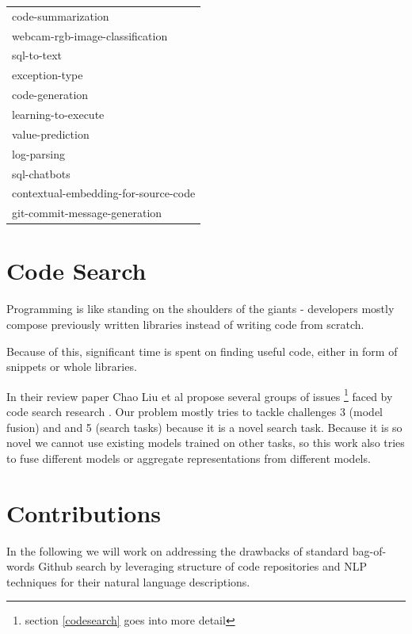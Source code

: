 \documentclass[11pt]{report}
\begin{document}
\begin{table}[htbp]
\begin{tabular}{|l|}
                            code-summarization \\
               {\color{red} webcam-rgb-image-classification}\\
                                   sql-to-text \\
                                exception-type \\
                               code-generation \\
                           learning-to-execute \\
                              value-prediction \\
                                   log-parsing \\
                                  sql-chatbots \\
          contextual-embedding-for-source-code \\
                 git-commit-message-generation \\
\bottomrule
\hline
\end{tabular}
\end{table}


\section{Code Search}


Programming is like standing on the shoulders of the giants - developers mostly compose previously written libraries instead of writing code from scratch.

Because of this, significant time is spent on finding useful code, either in form of snippets or whole libraries.

In their review paper Chao Liu et al \cite{code_search} propose several groups of issues \footnote{section \ref{codesearch} goes into more detail} faced by code search research . Our problem mostly tries to tackle challenges 3 (model fusion) and  and 5 (search tasks) because it is a novel search task. 
Because it is so novel we cannot use existing models trained on other tasks, so this work also tries to fuse different models or aggregate representations from different models.

\section{Contributions}



In the following we will work on addressing the drawbacks of standard bag-of-words Github search by leveraging structure of code repositories and NLP techniques for their natural language descriptions.
\end{document}
